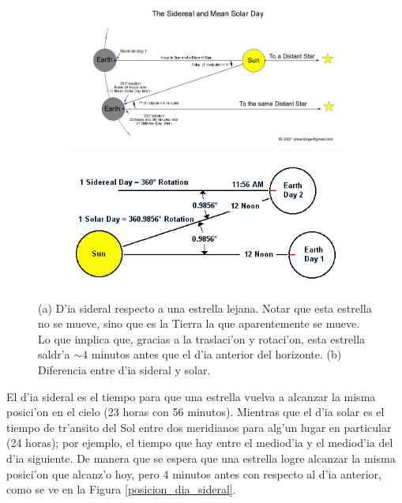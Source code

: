 \documentclass{article}
\begin{document}
\begin{figure} [h!]
\centering
\begin{subfigure}[b]{0.75\textwidth}
   \includegraphics[width=1\linewidth]{sidereal_day.jpg}
   \caption{}
   \label{fig:Ng1} 
\end{subfigure}

\begin{subfigure}[b]{0.55\textwidth}
   \includegraphics[width=1\linewidth]{sidereal_solar_day.png}
   \caption{}
   \label{fig:Ng2}
\end{subfigure}

\caption[Sidereal days]{(a) D'ia sideral respecto a una estrella lejana. Notar que esta estrella no se mueve, sino que es la Tierra la que aparentemente se mueve. Lo que implica que, gracias a la traslaci'on y rotaci'on, esta estrella saldr'a $\sim 4$ minutos antes que el d'ia anterior del horizonte. (b) Diferencia entre d'ia sideral y solar.} \label{dia_sideral}
\end{figure}

El d'ia sideral es el tiempo para que una estrella vuelva a alcanzar la misma posici'on en el cielo (23 horas con 56 minutos). Mientras que el d'ia solar es el tiempo de tr'ansito del Sol entre dos meridianos para alg'un lugar en particular (24 horas); por ejemplo, el tiempo que hay entre el mediod'ia y el mediod'ia del d'ia siguiente. De manera que se espera que una estrella logre alcanzar la misma posici'on que alcanz'o hoy, pero 4 minutos antes con respecto al d'ia anterior, como se ve en la Figura \ref{posicion_dia_sideral}.
\end{document}
